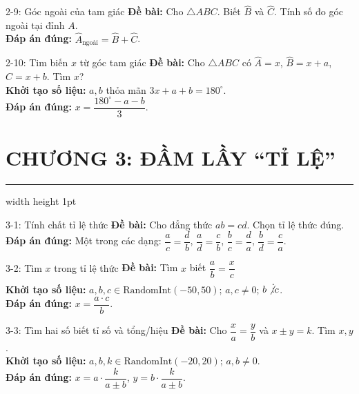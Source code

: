 \documentclass[11pt, a4paper]{article}
\begin{document}
\begin{qbox}{2-9: Góc ngoài của tam giác}
\textbf{Đề bài:} Cho $\triangle ABC$. Biết $\widehat{B}$ và $\widehat{C}$. Tính số đo góc ngoài tại đỉnh $A$. \\[0.3em]
\textbf{Đáp án đúng:} $\widehat{A}_{\text{ngoài}} = \widehat{B} + \widehat{C}$.
\end{qbox}

\begin{qbox}{2-10: Tim biến $x$ từ góc tam giác}
\textbf{Đề bài:} Cho $\triangle ABC$ có $\widehat{A} = x$, $\widehat{B} = x + a$, $\widehat{C} = x + b$. Tìm $x$? \\[0.3em]
\textbf{Khởi tạo số liệu:} $a, b$ thỏa mãn $3x + a + b = 180^\circ$. \\[0.3em]
\textbf{Đáp án đúng:} $x = \dfrac{180^\circ - a - b}{3}$.
\end{qbox}

\pagebreak

\section*{\Large \color{primary} CHƯƠNG 3: ĐẦM LẦY “TỈ LỆ”}
\hrule width \hsize height 1pt
\vspace{1em}

\begin{qbox}{3-1: Tính chất tỉ lệ thức}
\textbf{Đề bài:} Cho đẳng thức $ab = cd$. Chọn tỉ lệ thức đúng. \\[0.3em]
\textbf{Đáp án đúng:} Một trong các dạng: $\dfrac{a}{c} = \dfrac{d}{b}$, $\dfrac{a}{d} = \dfrac{c}{b}$, $\dfrac{b}{c} = \dfrac{d}{a}$, $\dfrac{b}{d} = \dfrac{c}{a}$.
\end{qbox}

\begin{qbox}{3-2: Tìm $x$ trong tỉ lệ thức}
\textbf{Đề bài:} Tìm $x$ biết $\dfrac{a}{b} = \dfrac{x}{c}$ \\[0.3em]
\textbf{Khởi tạo số liệu:} $a, b, c \in \text{RandomInt}(-50, 50)$; $a, c \neq 0$; $b \not\vdots c$. \\[0.3em]
\textbf{Đáp án đúng:} $x = \dfrac{a \cdot c}{b}$.
\end{qbox}

\begin{qbox}{3-3: Tìm hai số biết tỉ số và tổng/hiệu}
\textbf{Đề bài:} Cho $\dfrac{x}{a} = \dfrac{y}{b}$ và $x \pm y = k$. Tìm $x, y$. \\[0.3em]
\textbf{Khởi tạo số liệu:} $a, b, k \in \text{RandomInt}(-20, 20)$; $a, b \neq 0$. \\[0.3em]
\textbf{Đáp án đúng:} $x = a \cdot \dfrac{k}{a \pm b}$, $y = b \cdot \dfrac{k}{a \pm b}$.
\end{qbox}
\end{document}
